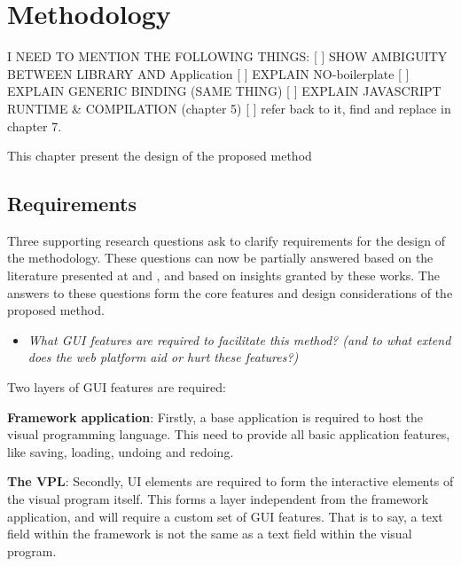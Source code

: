 \chapter{Methodology}
\label{chap:methodology}

\begin{note}
  I NEED TO MENTION THE FOLLOWING THINGS:
  [ ] SHOW AMBIGUITY BETWEEN LIBRARY AND Application
  [ ] EXPLAIN NO-boilerplate
  [ ] EXPLAIN GENERIC BINDING (SAME THING)
  [ ] EXPLAIN JAVASCRIPT RUNTIME & COMPILATION (chapter 5)
     [ ] refer back to it, find and replace in chapter 7.

\end{note}

This chapter present the design of the proposed method

\section{Requirements}

Three supporting research questions ask to clarify requirements for the design of the methodology. 
These questions can now be partially answered based on the literature presented at  and , and based on insights granted by these works.
The answers to these questions form the core features and design considerations of the proposed method.

\begin{itemize}[ ]
  \item \emph{What GUI features are required to facilitate this method? (and to what extend does the
  web platform aid or hurt these features?)}  
\end{itemize}

Two layers of \ac{GUI} features are required:

\textbf{Framework application}: Firstly, a base application is required to host the visual programming language.
This need to provide all basic application features, like saving, loading, undoing and redoing.

\textbf{The VPL}: Secondly, UI elements are required to form the interactive elements of the visual program itself. 
This forms a layer independent from the framework application, and will require a custom set of \ac{GUI} features. 
That is to say, a text field within the framework is not the same as a text field within the visual program.



